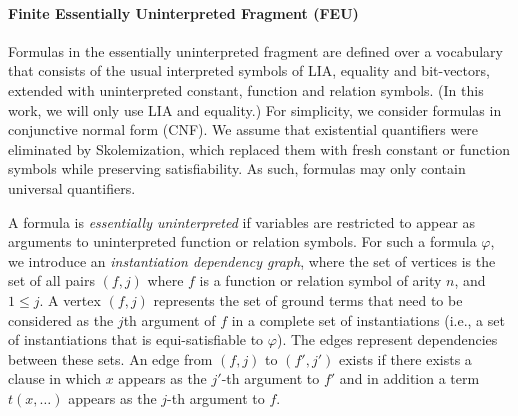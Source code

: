 
\paragraph{Finite Essentially Uninterpreted Fragment (FEU)}
Formulas in the essentially uninterpreted fragment are defined over a vocabulary that consists of the usual interpreted symbols of LIA, equality and bit-vectors, extended with uninterpreted constant, function and relation symbols. (In this work, we will only use LIA and equality.)
For simplicity, we consider formulas in conjunctive normal form (CNF).
We assume that existential quantifiers were eliminated by Skolemization, which replaced them with fresh constant or function symbols while preserving satisfiability. As such, formulas may only contain universal quantifiers.

A formula is \emph{essentially uninterpreted} if variables are restricted to appear as arguments to uninterpreted function or relation symbols.
For such a formula $\varphi$, we introduce an \emph{instantiation dependency graph}, where the set of vertices is the set of all pairs $(f,j)$ where $f$ is a function or relation symbol of arity $n$, and $1 \leq j$. A vertex $(f,j)$ represents the set of ground terms that need to be considered as the $j$th argument of $f$ in a complete set of instantiations (i.e., a set of instantiations that is equi-satisfiable to $\varphi$). The edges represent dependencies between these sets.
An edge from $(f,j)$ to $(f',j')$ exists if there exists a clause in which $x$ appears as the $j'$-th argument to $f'$ and in addition a term $t(x,\ldots)$ appears as the $j$-th argument to $f$.

